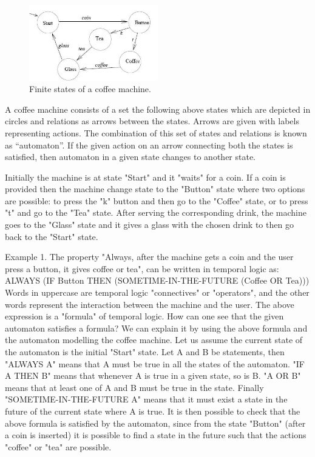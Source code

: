 \documentclass{article}
\begin{document}
\begin{figure}[h!]
  
  \centering
    \includegraphics[width=0.5\textwidth]{flower.png}
    \caption{Finite states of a coffee machine.}
\end{figure}


A coffee machine consists of a set the following above states which are depicted in circles and relations as arrows between the states. Arrows are given with labels representing actions. The combination of this set of states and relations is known as “automaton”.  If the given action on an arrow connecting both the states is satisfied, then automaton in a given state changes to another state. 



Initially the machine is at state "Start" and it "waits" for a coin. If a coin is provided then the machine change state to the "Button" state where two options are possible: to press the "k" button and then go to the "Coffee" state, or to press "t" and go to the "Tea" state. After serving the corresponding drink, the machine goes to the "Glass" state and it gives a glass with the chosen drink to then go back to the "Start" state.


Example 1.
The property "Always, after the machine gets a coin and the user press a button, it gives coffee or tea", can be written in temporal logic as:
ALWAYS (IF Button THEN (SOMETIME-IN-THE-FUTURE (Coffee OR Tea)))
Words in uppercase are temporal logic "connectives" or "operators", and the other words represent the interaction between the machine and the user. The above expression is a "formula" of temporal logic.
How can one see that the given automaton satisfies a formula? We can explain it by using the above formula and the automaton modelling the coffee machine.
Let us assume the current state of the automaton is the initial "Start" state. Let A and B be statements, then "ALWAYS A" means that A must be true in all the states of the automaton. "IF A THEN B" means that whenever A is true in a given state, so is B. "A OR B" means that at least one of A and B must be true in the state. Finally "SOMETIME-IN-THE-FUTURE A" means that it must exist a state in the future of the current state where A is true.
It is then possible to check that the above formula is satisfied by the automaton, since from the state "Button" (after a coin is inserted) it is possible to find a state in the future such that the actions "coffee" or "tea" are possible.
\end{document}
